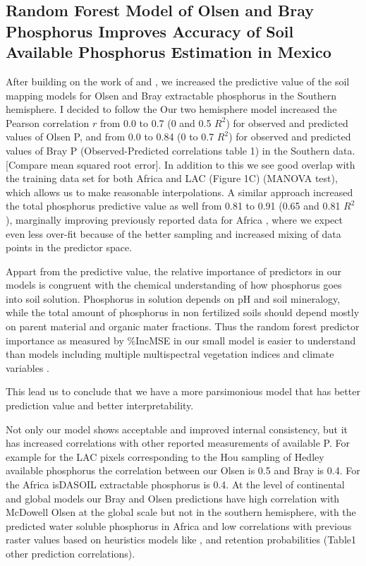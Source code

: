 \subsection{Random Forest Model of Olsen and Bray Phosphorus Improves Accuracy of Soil Available Phosphorus Estimation in  Mexico}
After building on the work of \cite{hexianjin2022} and \cite{mcdowell2023}, we increased the predictive value of the soil mapping models for Olsen and Bray extractable phosphorus in the Southern hemisphere. I decided to follow the  Our two hemisphere model increased the Pearson correlation $r$ from 0.0 to 0.7 (0 and 0.5 $R^2$) for observed and predicted values of Olsen P, and  from 0.0 to 0.84 (0 to 0.7 $R^2$) for observed and predicted values of Bray P (Observed-Predicted correlations table 1) in the Southern data.  [Compare mean squared root error]. In addition to this we see good overlap with the training data set for both Africa and LAC (Figure 1C) (MANOVA test), which allows us to make reasonable interpolations. A similar approach increased the total phosphorus predictive value as well from 0.81 to 0.91 (0.65 and 0.81 $R^2$), marginally improving previously reported data for Africa \citep{hengl2017a}, where we expect even less over-fit because of the better sampling and increased mixing of data points in the predictor space.


Appart from the predictive value,  the relative importance of predictors in our models is congruent with the chemical understanding of how phosphorus goes into soil solution.
Phosphorus in solution depends on pH and soil mineralogy, while the total amount of phosphorus in non fertilized soils should depend mostly on parent material and organic mater fractions.
Thus the random forest predictor importance as measured by \%IncMSE in our small model is easier to understand than models including multiple multispectral vegetation indices and climate variables \citep{mcdowell2023}.

This lead us to conclude that we have a more parsimonious model that has better prediction value and better interpretability.

Not only our model shows acceptable and improved internal consistency, but it has increased correlations with other reported measurements of available P. For example for the LAC pixels corresponding to the Hou sampling of Hedley available phosphorus the correlation between our Olsen is 0.5  and Bray is 0.4. For the Africa isDASOIL \citep{miller2021b} extractable phosphorus is 0.4.
At the level of continental and global models our Bray and Olsen predictions have high correlation with McDowell Olsen at the global scale but not in the southern hemisphere, with the predicted water soluble phosphorus in Africa \citep{miller2021b,hengl2017a}and low correlations with previous raster values based on heuristics models like \cite{shangguan2014}, \cite{yang2013} and\cite{batjes2011} retention probabilities (Table1 other prediction correlations).

